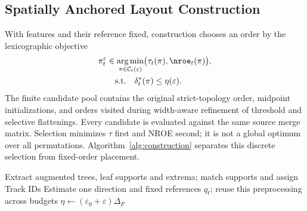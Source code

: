 \subsection{Spatially Anchored Layout Construction}\label{sec:construction}
With features and their reference fixed, construction chooses an order by the lexicographic objective
\begin{equation}\label{eq:orderobjective}
\begin{aligned}
 \pi_t^\varepsilon&\in\underset{\pi\in\mathcal{C}_t(\varepsilon)}{\arg\min}
                    \bigl(\tau_t(\pi),\nroe_t(\pi)\bigr),\\
 &\hspace{1em}\mathrm{s.t.}\quad\delta_t^*(\pi)\le\eta(\varepsilon).
\end{aligned}
\end{equation}
The finite candidate pool contains the original strict-topology order, midpoint initializations, and orders visited during width-aware refinement of threshold and selective flattenings. Every candidate is evaluated against the same source merge matrix. Selection minimizes $\tau$ first and NROE second; it is not a global optimum over all permutations. Algorithm~\ref{alg:construction} separates this discrete selection from fixed-order placement.

\begin{algorithm}[htbp]
\caption{Single-Control AnchorMTM}\label{alg:construction}
Extract augmented trees, leaf supports and extrema; match supports and assign Track IDs\;
Estimate one direction and fixed references $q_t$; reuse this preprocessing across budgets\;
$\eta\leftarrow(\varepsilon_0+\varepsilon)\Delta_F$\;
\;
\end{algorithm}

